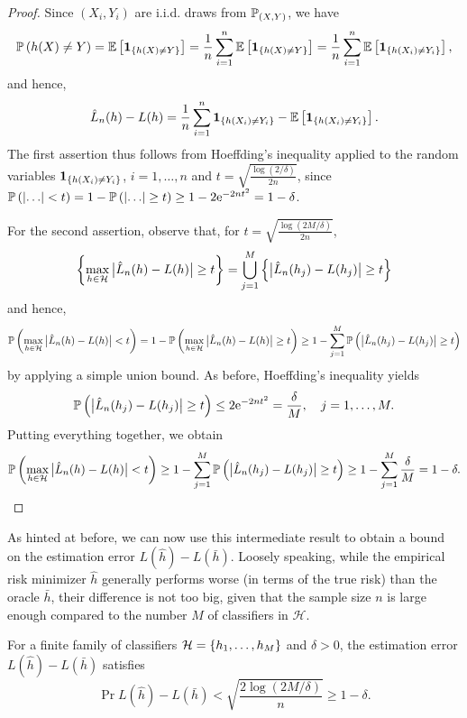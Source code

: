 \begin{proof}
Since $(X_i, Y_i)$ are i.i.d. draws from $\P_{(X, Y)}$, we have
\[
    \Pr{h(X) \neq Y} = \Ex{\indSet{h(X) \neq Y}} = \frac{1}{n} \sum_{i=1}^n \Ex{\indSet{h(X) \neq Y}} = \frac{1}{n} \sum_{i=1}^n \Ex{\indSet{h(X_i) \neq Y_i}},
\]
and hence,
\[
    \hat L_n(h) - L(h) = \frac{1}{n} \sum_{i=1}^n \indSet{h(X_i) \neq Y_i} - \Ex{\indSet{h(X_i) \neq Y_i}}.
\]
The first assertion thus follows from Hoeffding's inequality applied to the random variables $\indSet{h(X_i) \neq Y_i}$, $i = 1, \dots, n$ and $t = \sqrt{\frac{\log(2/\delta)}{2n}}$, since $\Pr{\abs{\ldots} < t} = 1 - \Pr{\abs{\ldots} \geq t} \geq 1 - 2\e^{-2nt^2} = 1 - \delta$.

For the second assertion, observe that, for $t = \sqrt{\frac{\log(2M/\delta)}{2n}}$,
\[
    \set{\max_{h \in \mathcal{H}} \bigAbs{ \hat L_n(h) - L(h) } \geq t} = \bigcup_{j=1}^M \set{\bigAbs{ \hat L_n(h_j) - L(h_j) } \geq t}
\]
and hence,
\[
    \Pr{\max_{h \in \mathcal{H}} \bigAbs{ \hat L_n(h) - L(h) } < t} = 1 - \Pr{\max_{h \in \mathcal{H}} \bigAbs{ \hat L_n(h) - L(h) } \geq t} \geq 1 - \sum_{j=1}^M \Pr{\bigAbs{ \hat L_n(h_j) - L(h_j) } \geq t}
\]
by applying a simple union bound. As before, Hoeffding's inequality yields
\[
    \Pr{\bigAbs{ \hat L_n(h_j) - L(h_j) } \geq t} \leq 2\e^{-2nt^2} = \frac{\delta}{M}, \quad j = 1, \dots, M.
\]
Putting everything together, we obtain
\[
    \Pr{\max_{h \in \mathcal{H}} \bigAbs{ \hat L_n(h) - L(h) } < t} \geq 1 - \sum_{j=1}^M \Pr{\bigAbs{ \hat L_n(h_j) - L(h_j) } \geq t} \geq 1 - \sum_{j=1}^M \frac{\delta}{M} = 1 - \delta.
\]
\end{proof}

As hinted at before, we can now use this intermediate result to obtain a bound on the estimation error $L(\hat h) - L(\bar h)$. Loosely speaking, while the empirical risk minimizer $\hat h$ generally performs worse (in terms of the true risk) than the oracle $\bar h$, their difference is not too big, given that the sample size $n$ is large enough compared to the number $M$ of classifiers in $\mathcal{H}$.

\begin{theorem}
\label{thm: estimation error finite dictionary}
For a finite family of classifiers $\mathcal{H} = \set{h_1, \dots, h_M}$ and $\delta > 0$, the estimation error $L(\hat h) - L(\bar h)$ satisfies
\[
    \Pr{L(\hat h) - L(\bar h) < \sqrt{\frac{2\log(2M/\delta)}{n}}} \geq 1 - \delta.
\]
\end{theorem}

